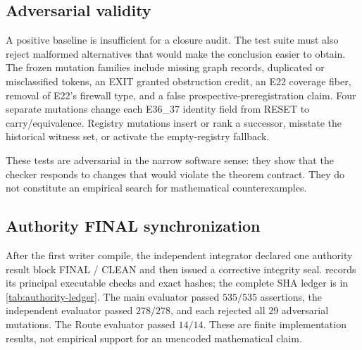 \subsection{Adversarial validity}

A positive baseline is insufficient for a closure audit.  The test suite must
also reject malformed alternatives that would make the conclusion easier to
obtain.  The frozen mutation families include missing graph records, duplicated
or misclassified tokens, an EXIT granted obstruction credit, an E22 coverage
fiber, removal of E22's firewall type, and a false prospective-preregistration
claim.  Four separate mutations change each E36\_37 identity field from RESET
to carry/equivalence.  Registry mutations insert or rank a successor, misstate
the historical witness set, or activate the empty-registry fallback.

These tests are adversarial in the narrow software sense: they show that the
checker responds to changes that would violate the theorem contract.  They do
not constitute an empirical search for mathematical counterexamples.

\subsection{Authority FINAL synchronization}

After the first writer compile, the independent integrator declared one
authority result block FINAL / CLEAN and then issued a corrective integrity
seal.   records its principal executable checks and
exact hashes; the complete SHA ledger is in
\cref{tab:authority-ledger}.  The main evaluator passed $535/535$ assertions,
the independent evaluator passed $278/278$, and each rejected all $29$
adversarial mutations.  The Route evaluator passed $14/14$.  These are finite
implementation results, not empirical support for an unencoded mathematical
claim.

